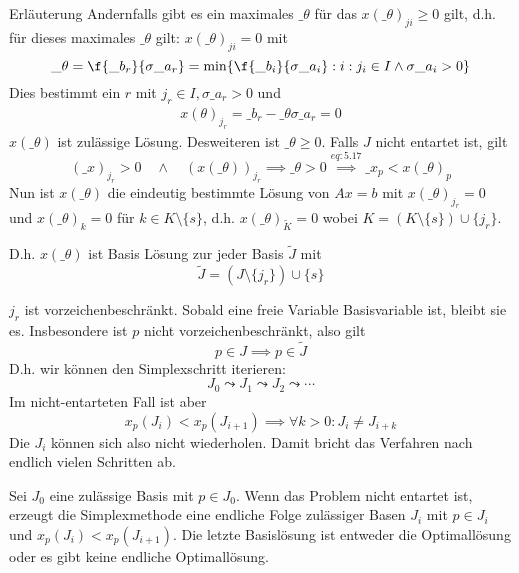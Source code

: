 \documentclass{mycourse}
\begin{document}
\begin{note}{Erläuterung}
	Andernfalls gibt es ein maximales $\_\theta$ für das $x(\_\theta)_{ji} \ge 0$ gilt, d.h. für dieses maximales $\_\theta$ gilt: $x(\_\theta)_{ji} = 0$ mit 
	\[
		\_\theta = \f {\_b_r}{\sigma \_a_r} = \min \{\f{\_b_i}{\sigma \_a_i} : i : j_i\in I \land \sigma \_a_i > 0\}
	\]
	Dies bestimmt ein $r$ mit $j_r\in I, \sigma \_a_r > 0$ und
	\begin{align}
		\label{eq:5.17}
		x(\theta)_{j_r} = \_b_r - \_\theta \sigma \_a_r = 0
	\end{align}
	$x(\_\theta)$ ist zulässige Lösung.
	Desweiteren ist $\_\theta \ge 0$.
	Falls $J$ nicht entartet ist, gilt
	\[
		(\_x)_{j_r} > 0 \quad \land \quad (x(\_\theta))_{j_r} \implies \_\theta > 0 \stackrel{eq:5.17}\implies \_x_p < x(\_\theta)_p
	\]
	Nun ist $x(\_\theta)$ die eindeutig bestimmte Lösung von $Ax=b$ mit $x(\_\theta)_{j_r}=0$ und $x(\_\theta)_k = 0$ für $k\in K\setminus \{s\}$, d.h. $x(\_\theta)_{\tilde K} = 0$ wobei $K=(K\setminus \{s\})\cup \{j_r\}$.

	D.h. $x(\_\theta)$ ist Basis Lösung zur jeder Basis $\tilde J$ mit
	\[
		\tilde J = (J\setminus \{j_r\}) \cup \{s\}
	\]
\end{note}

\begin{note}
	$j_r$ ist vorzeichenbeschränkt.
	Sobald eine freie Variable Basisvariable ist, bleibt sie es.
	Insbesondere ist $p$ nicht vorzeichenbeschränkt, also gilt
	\[
		p\in J \implies p\in \tilde J
	\]
	D.h. wir können den Simplexschritt iterieren:
	\[
		J_0 \leadsto J_1 \leadsto J_2 \leadsto \dotsb
	\]
	Im nicht-entarteten Fall ist aber
	\[
		x_p(J_i) < x_p(J_{i+1}) \implies \forall k>0  : J_i \neq J_{i+k}
	\]
	Die $J_i$ können sich also nicht wiederholen.
	Damit bricht das Verfahren nach endlich vielen Schritten ab.
\end{note}

\begin{st}
	\label{st:5.6}
	Sei $J_0$ eine zulässige Basis mit $p\in J_0$.
	Wenn das Problem nicht entartet ist, erzeugt die Simplexmethode eine endliche Folge zulässiger Basen $J_i$ mit $p\in J_i$ und $x_p(J_i) < x_p(J_{i+1})$.
	Die letzte Basislösung ist entweder die Optimallösung oder es gibt keine endliche Optimallösung.
\end{st}
\end{document}
